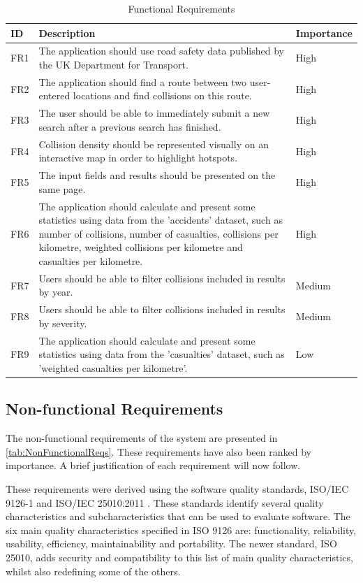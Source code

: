 \documentclass[authoryearcitations]{UoYCSproject}
\begin{document}
\begin{table}[tbp]
\center
\caption{Functional Requirements}
\begin{tabular}{| p{1.5cm} | p{9.5cm} | p{2cm} |}
	\hline
	\textbf{ID} & \textbf{Description} & \textbf{Importance} \\ \hline
	FR1 & The application should use road safety data published by the UK Department for Transport. & High \\ \hline
	FR2 & The application should find a route between two user-entered locations and find collisions on this route. & High \\ \hline
	FR3 & The user should be able to immediately submit a new search after a previous search has finished. & High \\ \hline
	FR4 & Collision density should be represented visually on an interactive map in order to highlight hotspots. & High \\ \hline
	FR5 & The input fields and results should be presented on the same page. & High \\ \hline
	FR6 & The application should calculate and present some statistics using data from the 'accidents' dataset, such as number of collisions, number of casualties, collisions per kilometre, weighted collisions per kilometre and casualties per kilometre. & High \\ \hline
	FR7 & Users should be able to filter collisions included in results by year. & Medium \\ \hline
	FR8 & Users should be able to filter collisions included in results by severity. & Medium \\ \hline
	FR9 & The application should calculate and present some statistics using data from the 'casualties' dataset, such as 'weighted casualties per kilometre'. & Low \\ \hline
\end{tabular}
\label{tab:FunctionalReqs}
\end{table}

\subsection{Non-functional Requirements}

The non-functional requirements of the system are presented in \autoref{tab:NonFunctionalReqs}. These requirements have also been ranked by importance. A brief justification of each requirement will now follow. 

These requirements were derived using the software quality standards, ISO/IEC 9126-1\citep{InternationalOrganizationForStandardizationIso2001} and ISO/IEC 25010:2011 \citep{InternationalOrganizationForStandardizationIso2011}. These standards identify several quality characteristics and subcharacteristics that can be used to evaluate software. The six main quality characteristics specified in ISO 9126 are: functionality, reliability, usability, efficiency, maintainability and portability. The newer standard, ISO 25010, adds security and compatibility to this list of main quality characteristics, whilst also redefining some of the others.
\end{document}
